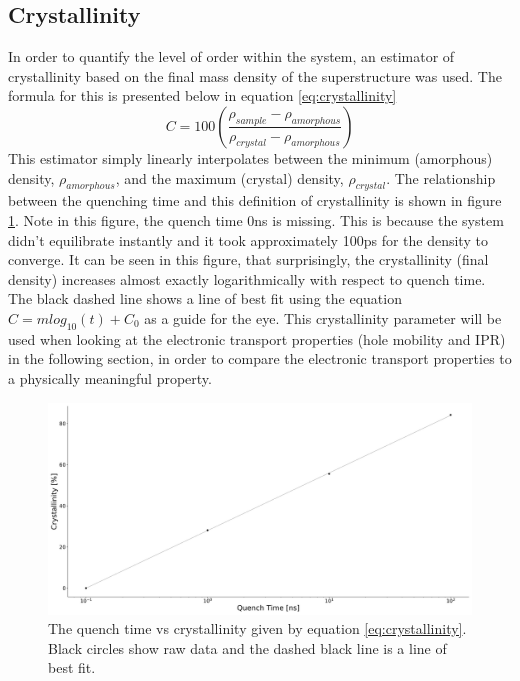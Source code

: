 \subsection{Crystallinity}
In order to quantify the level of order within the system, an estimator of crystallinity based on the final mass density of the superstructure was used. The formula for this is presented below in equation \eqref{eq:crystallinity}
\begin{equation}
  C = 100 \left(\frac{\rho_{sample} - \rho_{amorphous}}{\rho_{crystal} - \rho_{amorphous}}\right)
  \label{eq:crystallinity}
\end{equation}
This estimator simply linearly interpolates between the minimum (amorphous) density, $\rho_{amorphous}$, and the maximum (crystal) density, $\rho_{crystal}$. The relationship between the quenching time and this definition of crystallinity is shown in figure \ref{fig:crystallinity}. Note in this figure, the quench time 0ns is missing. This is because the system didn't equilibrate instantly and it took approximately 100ps for the density to converge. It can be seen in this figure, that surprisingly, the crystallinity (final density) increases almost exactly logarithmically with respect to quench time. The black dashed line shows a line of best fit using the equation $C = m log_{10}(t) + C_{0}$ as a guide for the eye. This crystallinity parameter will be used when looking at the electronic transport properties (hole mobility and IPR) in the following section, in order to compare the electronic transport properties to a physically meaningful property.
\begin{figure}[htp]
  \includegraphics[width=\textwidth]{./img/DifferentQuenchTimes/QuenchTvsCrystallinity.png}
  \caption{\label{fig:crystallinity}The quench time vs crystallinity given by equation \ref{eq:crystallinity}. Black circles show raw data and the dashed black line is a line of best fit.}
\end{figure}


